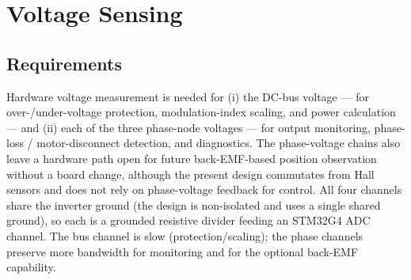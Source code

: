 \documentclass[journal,onecolumn,11pt]{IEEEtran}
\begin{document}
\section{Voltage Sensing}\label{sec:voltage}

\subsection{Requirements}
Hardware voltage measurement is needed for (i) the DC-bus voltage --- for over-/under-voltage
protection, modulation-index scaling, and power calculation --- and (ii) each of the three phase-node
voltages --- for output monitoring, phase-loss / motor-disconnect detection, and diagnostics. The
phase-voltage chains also leave a hardware path open for future back-EMF-based position observation
without a board change, although the present design commutates from Hall sensors and does not rely
on phase-voltage feedback for control. All four channels share the inverter ground (the design is
non-isolated and uses a single shared ground), so each is a grounded resistive divider feeding an
STM32G4 ADC channel. The bus channel is slow (protection/scaling); the phase channels preserve more
bandwidth for monitoring and for the optional back-EMF capability.
\end{document}
